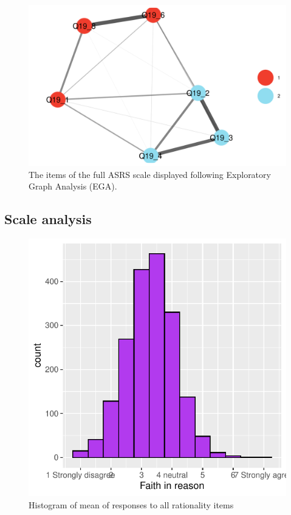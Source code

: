 \documentclass[
  ,jou,floatsintext]{apa6}
\begin{document}
\begin{figure}

{\centering \includegraphics[width=1\linewidth]{plots/reason6_ega} 

}

\caption{The items of the full ASRS scale displayed following Exploratory Graph Analysis (EGA).}\label{fig:egasix}
\end{figure}

\hypertarget{scale-analysis}{%
\subsection{Scale analysis}\label{scale-analysis}}

\begin{figure}

{\centering \includegraphics[width=0.75\linewidth]{faithinreason_files/figure-latex/meanhistogram-1} 

}

\caption{Histogram of mean of responses to all rationality items}\label{fig:meanhistogram}
\end{figure}
\end{document}
